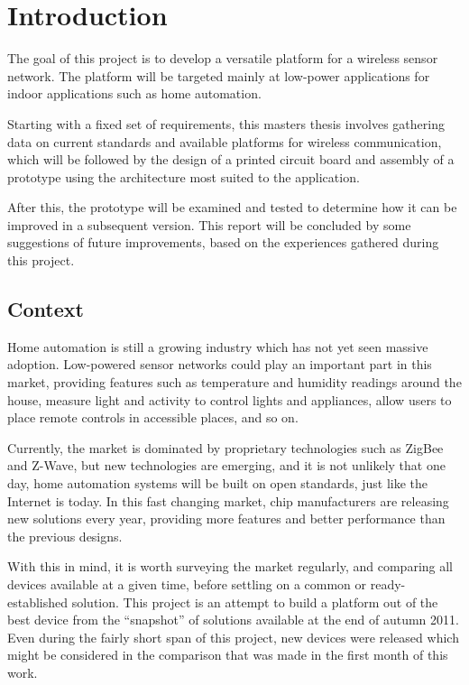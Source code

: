 \chapter{Introduction}\label{ch:introduction}

The goal of this project is to develop a versatile platform for a wireless
sensor network. The platform will be targeted mainly at low-power applications
for indoor applications such as home automation. 

Starting with a fixed set of requirements, this masters thesis involves
gathering data on current standards and available platforms for wireless
communication, which will be followed by the design of a printed circuit board
and assembly of a prototype using the architecture most suited to the
application.

After this, the prototype will be examined and tested to determine how it can be
improved in a subsequent version. This report will be concluded by some
suggestions of future improvements, based on the experiences gathered during
this project.

\section{Context}\label{sec:context}

Home automation is still a growing industry which has not yet seen massive
adoption. Low-powered sensor networks could play an important part in this
market, providing features such as temperature and humidity readings around the
house, measure light and activity to control lights and appliances, allow users
to place remote controls in accessible places, and so on.

Currently, the market is dominated by proprietary technologies such as ZigBee
and Z-Wave, but new technologies are emerging, and it is not unlikely that one
day, home automation systems will be built on open standards, just like the
Internet is today. In this fast changing market, chip manufacturers are
releasing new solutions every year, providing more features and better
performance than the previous designs. 

With this in mind, it is worth surveying the market regularly, and comparing all
devices available at a given time, before settling on a common or
ready-established solution. This project is an attempt to build a platform out
of the best device from the ``snapshot'' of solutions available at the end of
autumn 2011. Even during the fairly short span of this project, new devices were
released which might be considered in the comparison that was made in the first
month of this work.

